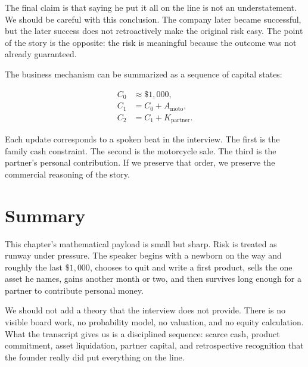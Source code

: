 The final claim is that saying he put it all on the line is not an understatement. We should be careful with this conclusion. The company later became successful, but the later success does not retroactively make the original risk easy. The point of the story is the opposite: the risk is meaningful because the outcome was not already guaranteed.

The business mechanism can be summarized as a sequence of capital states:

\begin{align}
C_0 &\approx \$1{,}000, \\
C_1 &= C_0 + A_{\mathrm{moto}}, \\
C_2 &= C_1 + K_{\mathrm{partner}}.
\end{align}

Each update corresponds to a spoken beat in the interview. The first is the family cash constraint. The second is the motorcycle sale. The third is the partner's personal contribution. If we preserve that order, we preserve the commercial reasoning of the story.

\section{Summary}

This chapter's mathematical payload is small but sharp. Risk is treated as runway under pressure. The speaker begins with a newborn on the way and roughly the last \(\$1{,}000\), chooses to quit and write a first product, sells the one asset he names, gains another month or two, and then survives long enough for a partner to contribute personal money.

We should not add a theory that the interview does not provide. There is no visible board work, no probability model, no valuation, and no equity calculation. What the transcript gives us is a disciplined sequence: scarce cash, product commitment, asset liquidation, partner capital, and retrospective recognition that the founder really did put everything on the line.